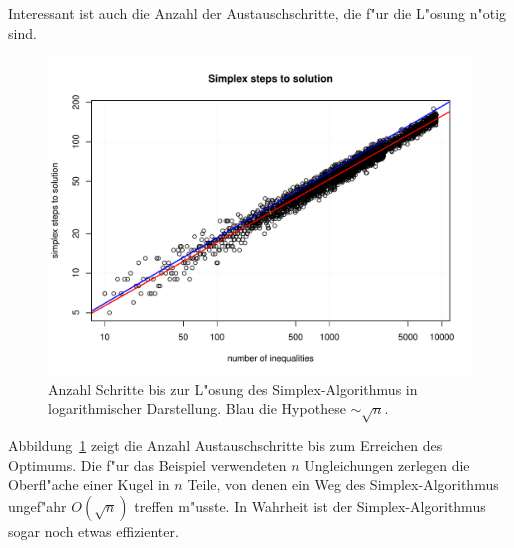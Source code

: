 Interessant ist auch die Anzahl der Austauschschritte, die f"ur die
L"osung n"otig sind. 
\begin{figure}
\begin{center}
\includegraphics[width=\hsize]{add/pathsteploghyp.pdf}
\end{center}
\caption{Anzahl Schritte bis zur L"osung des Simplex-Algorithmus
in logarithmischer Darstellung.
Blau die Hypothese $\sim\sqrt{n}$.
\label{simplex:pathsteps}}
\end{figure}
Abbildung~\ref{simplex:pathsteps} zeigt die Anzahl Austauschschritte bis
zum Erreichen des Optimums. Die f"ur das Beispiel
verwendeten $n$ Ungleichungen zerlegen die Oberfl"ache einer Kugel in
$n$ Teile, von denen ein Weg des Simplex-Algorithmus ungef"ahr 
$O(\sqrt{n})$ treffen m"usste. In Wahrheit ist der Simplex-Algorithmus
sogar noch etwas effizienter.


